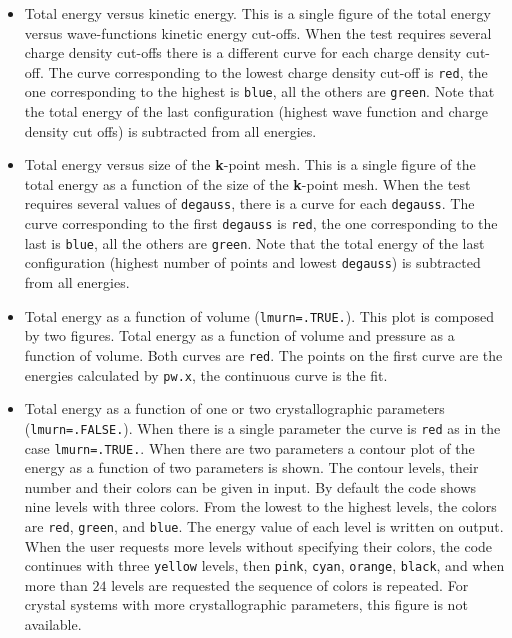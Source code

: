 \documentclass[12pt,a4paper]{article}
\begin{document}
\begin{itemize} 
\item
Total energy versus kinetic energy. This is a single figure of the total
energy versus wave-functions kinetic energy cut-offs. When the test
requires several charge density cut-offs there is a different curve
for each charge density cut-off. The curve corresponding to the lowest
charge density cut-off is \texttt{red}, the one corresponding to the
highest is \texttt{blue}, all the others are \texttt{green}.
Note that the total energy of the last configuration (highest wave function
and charge density cut offs) is subtracted from all energies.

\item
Total energy versus size of the {\bf k}-point mesh. This is a single
figure of the total energy as a function of the size of the {\bf k}-point
mesh. When the test requires several values of \texttt{degauss}, there
is a curve for each \texttt{degauss}. The curve corresponding to the
first \texttt{degauss} is \texttt{red}, the one corresponding to the
last is \texttt{blue}, all the others are \texttt{green}.          
Note that the total energy of the last configuration (highest number of
points and lowest \texttt{degauss}) is subtracted from all energies.

\item
Total energy as a function of volume (\texttt{lmurn=.TRUE.}). 
This plot is composed by two figures. Total energy as a function of volume 
and pressure as a function of volume. Both curves are \texttt{red}.   
The points on the first curve are the energies calculated by 
\texttt{pw.x}, the continuous curve is the fit.

\item
Total energy as a function of one or two crystallographic parameters
(\texttt{lmurn=.FALSE.}). When there is a single parameter the curve is
\texttt{red} as in the case \texttt{lmurn=.TRUE.}. When there are two
parameters a contour plot of the energy as a function of two parameters
is shown. The contour levels, their number and their colors can be
given in input. By default the code shows nine levels with three
colors. From the lowest to the highest levels, the colors are \texttt{red},
\texttt{green}, and \texttt{blue}. The energy value of each level is 
written on output. When the user requests more levels without specifying
their colors, the code continues with three \texttt{yellow} levels, 
then \texttt{pink}, \texttt{cyan}, \texttt{orange}, \texttt{black}, and
when more than $24$ levels are requested the sequence of colors is repeated.
For crystal systems with more crystallographic parameters, this figure is
not available.


\end{itemize}
\end{document}
